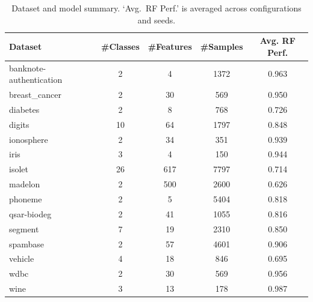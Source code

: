 \documentclass[runningheads]{llncs}
\begin{document}
\begin{table}[t]
  \centering
  \small
  \caption{Dataset and model summary. `Avg.\ RF Perf.' is averaged across configurations and seeds.}
  \label{tab:datasets-models-summary}
  \begin{tabular}{lcccc}
    \toprule
    Dataset & \#Classes & \#Features & \#Samples & Avg. RF Perf. \\
    \midrule
    banknote-authentication & 2 & 4 & 1372 & 0.963 \\
    breast\_cancer & 2 & 30 & 569 & 0.950 \\
    diabetes & 2 & 8 & 768 & 0.726 \\
    digits & 10 & 64 & 1797 & 0.848 \\
    ionosphere & 2 & 34 & 351 & 0.939 \\
    iris & 3 & 4 & 150 & 0.944 \\
    isolet & 26 & 617 & 7797 & 0.714 \\
    madelon & 2 & 500 & 2600 & 0.626 \\
    phoneme & 2 & 5 & 5404 & 0.818 \\
    qsar-biodeg & 2 & 41 & 1055 & 0.816 \\
    segment & 7 & 19 & 2310 & 0.850 \\
    spambase & 2 & 57 & 4601 & 0.906 \\
    vehicle & 4 & 18 & 846 & 0.695 \\
    wdbc & 2 & 30 & 569 & 0.956 \\
    wine & 3 & 13 & 178 & 0.987 \\
    \bottomrule
  \end{tabular}
\end{table}
\end{document}

